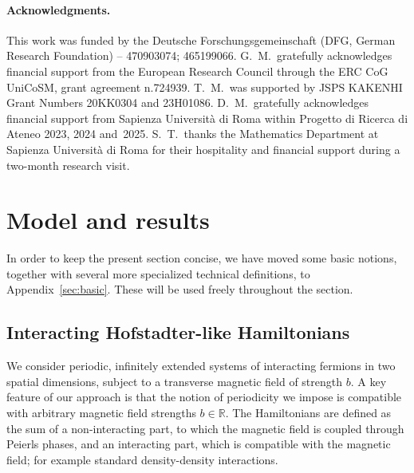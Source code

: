 \documentclass[a4paper]{article}
\theoremstyle{plain}
\theoremstyle{definition}
\theoremstyle{remark}
\renewcommand{\(}{\left(}
\renewcommand{\)}{\right)}
\begin{document}
\paragraph{Acknowledgments.}
This work was funded by the \foreignlanguage{ngerman}{Deutsche Forschungsgemeinschaft} (DFG, German Research Foundation) – 470903074; 465199066. 
G.~M.\ gratefully acknowledges financial support from the European Research Council through the ERC CoG UniCoSM, grant agreement n.724939. 
T.~M.~was supported by JSPS KAKENHI Grant Numbers 20KK0304 and 23H01086. 
D.~M.~gratefully acknowledges financial support from Sapienza Universit\`{a} di Roma within Progetto di Ricerca di Ateneo 2023, 2024 and~2025. 
S.~T.~thanks the Mathematics Department at Sapienza Universit\`{a} di Roma for their hospitality and financial support during a two-month research visit. 


\section{Model and results} \label{sec:MR}



In order to keep the present section concise, we have moved some basic notions, together with several more specialized technical definitions, to Appendix~\ref{sec:basic}. These will be used freely throughout the section.

\subsection{Interacting Hofstadter-like Hamiltonians} \label{sec:models}

 


We consider periodic, infinitely extended systems of interacting fermions in two spatial dimensions, subject to a transverse magnetic field of strength $b$.
A key feature of our approach is that the notion of periodicity we impose is compatible with arbitrary magnetic field strengths $b\in\mathbb{R}$.
The Hamiltonians are defined as the sum of a non-interacting part, to which the magnetic field is coupled through Peierls phases, and an interacting part,   which is compatible with the magnetic field; for example  standard density-density interactions.  

 
\end{document}
